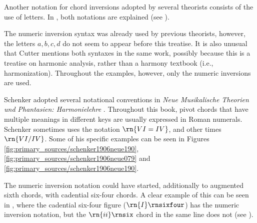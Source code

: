
Another notation for chord inversions adopted by several
theorists consists of the use of letters. In
\textcite{cutter1902harmonic}, both notations are explained
(see ).


The numeric inversion syntax was already used by previous
theorists, however, the letters ${a, b, c , d}$ do not seem
to appear before this treatise. It is also unusual that
Cutter mentions both syntaxes in the same work, possibly
because this is a treatise on harmonic analysis, rather than
a harmony textbook (i.e., harmonization). Throughout the
examples, however, only the numeric inversions are used.

Schenker adopted several notational conventions in
\emph{Neue Musikalische Theorien und Phantasien:
Harmonielehre} \parencite{schenker1906neue}. Throughout this
book, pivot chords that have multiple meanings in different
keys are usually expressed in Roman numerals. Schenker
sometimes uses the notation $\rn{VI=IV}$, and other times
$\rn{VI/IV}$. Some of his specific examples can be seen in
Figures \ref{fig:primary_sources/schenker1906neue190},
\ref{fig:primary_sources/schenker1906neue079} and
\ref{fig:primary_sources/schenker1906neue190}.




The numeric inversion notation could have started,
additionally to augmented sixth chords, with cadential
six-four chords. A clear example of this can be seen in
\textcite{loewengard1908lehrbuch}, where the cadential
six-four figure ($\rn{I}\rnsixfour$) has the numeric
inversion notation, but the $\rn{ii}\rnsix$ chord in the
same line does not (see
).


